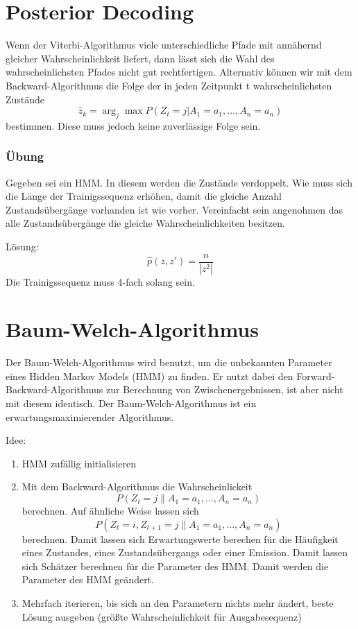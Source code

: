 \section{Posterior Decoding}
Wenn der Viterbi-Algorithmus viele unterschiedliche Pfade mit annähernd gleicher Wahrscheinlichkeit liefert, dann lässt sich die Wahl des wahrscheinlichsten Pfades nicht gut rechtfertigen.
Alternativ können wir mit dem Backward-Algorithmus die Folge der in jeden Zeitpunkt t wahrscheinlichsten Zustände
\[ \hat z_{k} = \arg_{j}\max P(Z_{t} = j | A_{1} = a_{1}, \ldots, A_{n} = a_{n}) \]
bestimmen.
Diese muss jedoch keine zuverlässige Folge sein.

\subsubsection{Übung}
Gegeben sei ein HMM.
In diesem werden die Zustände verdoppelt.
Wie muss sich die Länge der Trainigssequenz erhöhen, damit die gleiche Anzahl Zustandsübergänge vorhanden ist wie vorher.
Vereinfacht sein angenohmen das alle Zustandsübergänge die gleiche Wahrscheinlichkeiten besitzen.

Lösung:
\[\hat p(z,z') = \frac{n}{|z^2|}\]
Die Trainigssequenz muss 4-fach solang sein.

\section{Baum-Welch-Algorithmus}
Der Baum-Welch-Algorithmus wird benutzt, um die unbekannten Parameter eines Hidden Markov Models (HMM) zu finden.
Er nutzt dabei den Forward-Backward-Algorithmus zur Berechnung von Zwischenergebnissen, ist aber nicht mit diesem identisch.
Der Baum-Welch-Algorithmus ist ein erwartungsmaximierender Algorithmus.

Idee:
\begin{enumerate}
	\item HMM zufällig initialisieren
	\item Mit dem Backward-Algorithmus die Wahrscheinlickeit \[P(Z_{t} = j \| A_{1} = a_{1}, \ldots, A_{n} = a_{n})\]berechnen.
			Auf ähnliche Weise lassen sich \[P(Z_{t} = i, Z_{t+1} = j \| A_{1} = a_{1}, \ldots, A_{n} = a_{n})\] berechnen.
			Damit lassen sich Erwartungswerte berechen für die Häufigkeit eines Zustandes, eines Zustandsübergangs oder einer Emission.
			Damit lassen sich Schätzer berechnen für die Parameter des HMM.
			Damit werden die Parameter des HMM geändert.
	\item Mehrfach iterieren, bis sich an den Parametern nichts mehr ändert, beste Lösung ausgeben (größte Wahrscheinlichkeit für Ausgabesequenz)
\end{enumerate}
